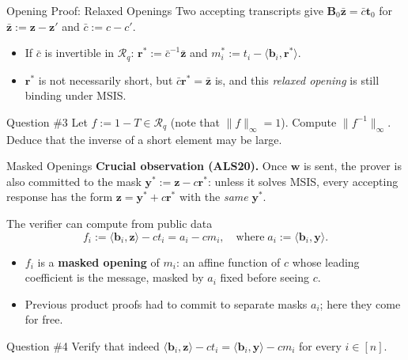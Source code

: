 \documentclass{zkdl-presentation-template}
\begin{document}
    \begin{frame}{Opening Proof: Relaxed Openings}
        Two accepting transcripts give $\mathbf{B}_0\bar{\mathbf{z}} = \bar{c}\mathbf{t}_0$ for $\bar{\mathbf{z}} := \mathbf{z}-\mathbf{z}'$ and $\bar{c} := c-c'$.
        \begin{itemize}
            \item If $\bar{c}$ is invertible in $\mathcal{R}_q$: $\mathbf{r}^{\ast} := \bar{c}^{-1}\bar{\mathbf{z}}$ and $m_i^{\ast} := t_i - \langle \mathbf{b}_i, \mathbf{r}^{\ast} \rangle$.\pause
            \item $\mathbf{r}^{\ast}$ is not necessarily short, but $\bar{c}\mathbf{r}^{\ast} = \bar{\mathbf{z}}$ is, and this \emph{relaxed opening} is still binding under MSIS.
        \end{itemize}
        \pause

        \begin{questionblock}{Question \#3}
            Let $f := 1-T \in \mathcal{R}_q$ (note that $\|f\|_{\infty}=1$). Compute $\|f^{-1}\|_{\infty}$. Deduce that the inverse of a short element may be large.
        \end{questionblock}
    \end{frame}

    \begin{frame}{Masked Openings}
        \textbf{Crucial observation (ALS20).} Once $\mathbf{w}$ is sent, the prover is also committed to the mask $\mathbf{y}^{\ast} := \mathbf{z} - c\mathbf{r}^{\ast}$: unless it solves MSIS, every accepting response has the form $\mathbf{z} = \mathbf{y}^{\ast} + c\mathbf{r}^{\ast}$ with the \emph{same} $\mathbf{y}^{\ast}$.
        \pause

        The verifier can compute from public data
        \begin{equation*}
            f_i := \langle \mathbf{b}_i, \mathbf{z} \rangle - ct_i = a_i - cm_i, \quad \text{where} \; a_i := \langle \mathbf{b}_i, \mathbf{y} \rangle.
        \end{equation*}
        \pause
        \vspace{-10pt}

        \begin{itemize}
            \item $f_i$ is a \textbf{masked opening} of $m_i$: an affine function of $c$ whose leading coefficient is the message, masked by $a_i$ fixed before seeing $c$.
            \item Previous product proofs had to commit to separate masks $a_i$; here they come for free.
        \end{itemize}
        \pause

        \begin{questionblock}{Question \#4}
            Verify that indeed $\langle \mathbf{b}_i, \mathbf{z} \rangle - ct_i = \langle \mathbf{b}_i, \mathbf{y} \rangle - cm_i$ for every $i \in [n]$.
        \end{questionblock}
    \end{frame}
\end{document}
